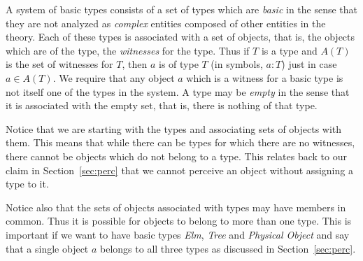 A system of basic types consists of a set of types which are \textit{basic} in
the sense that they are not analyzed as
\textit{complex} entities composed of other entities in the theory.
Each of these types is associated with a set of objects, that is, the
objects which are of the type, the \textit{witnesses} for the type.  Thus if $T$ is a type and $A(T)$ is the
set of witnesses for $T$, then $a$ is of type $T$ (in
symbols, $a:T$) just in case $a\in A(T)$.  We require that any object $a$
which is a witness for a basic type is not itself one of the types in
the system.  A type may be \textit{empty} in the sense that it is
associated with the empty set, that is, there is nothing of that
type. 

Notice that we are starting with the types and associating sets
of objects with them.  This means that while there can be types for
which there are no witnesses, there cannot be objects which do not
belong to a type.  This relates back to our claim in
Section~\ref{sec:perc} that we cannot perceive an object without
assigning a type to it.

Notice also that the sets of objects associated with types may have
members in common.  Thus it is possible for objects to belong to more
than one type.  This is important if we want to have basic types
\textit{Elm}, \textit{Tree} and \textit{Physical Object} and say that
a single object $a$ belongs to all three types as discussed in
Section~\ref{sec:perc}.

